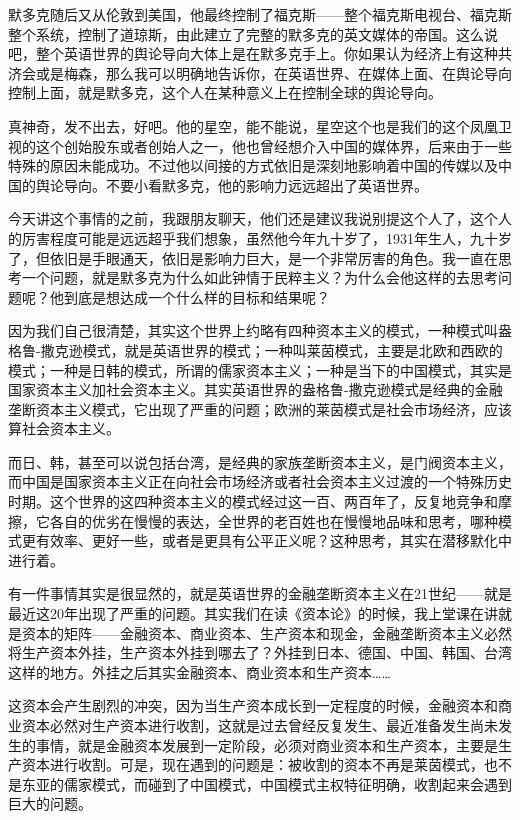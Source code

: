 \documentclass[UTF8, 12pt, a4paper]{ctexrep}
\begin{document}
默多克随后又从伦敦到美国，他最终控制了福克斯——整个福克斯电视台、福克斯整个系统，控制了道琼斯，由此建立了完整的默多克的英文媒体的帝国。这么说吧，整个英语世界的舆论导向大体上是在默多克手上。你如果认为经济上有这种共济会或是梅森，那么我可以明确地告诉你，在英语世界、在媒体上面、在舆论导向控制上面，就是默多克，这个人在某种意义上在控制全球的舆论导向。

真神奇，发不出去，好吧。他的星空，能不能说，星空这个也是我们的这个凤凰卫视的这个创始股东或者创始人之一，他也曾经想介入中国的媒体界，后来由于一些特殊的原因未能成功。不过他以间接的方式依旧是深刻地影响着中国的传媒以及中国的舆论导向。不要小看默多克，他的影响力远远超出了英语世界。

今天讲这个事情的之前，我跟朋友聊天，他们还是建议我说别提这个人了，这个人的厉害程度可能是远远超乎我们想象，虽然他今年九十岁了，1931年生人，九十岁了，但依旧是手眼通天，依旧是影响力巨大，是一个非常厉害的角色。我一直在思考一个问题，就是默多克为什么如此钟情于民粹主义？为什么会他这样的去思考问题呢？他到底是想达成一个什么样的目标和结果呢？

因为我们自己很清楚，其实这个世界上约略有四种资本主义的模式，一种模式叫盎格鲁-撒克逊模式，就是英语世界的模式；一种叫莱茵模式，主要是北欧和西欧的模式；一种是日韩的模式，所谓的儒家资本主义；一种是当下的中国模式，其实是国家资本主义加社会资本主义。其实英语世界的盎格鲁-撒克逊模式是经典的金融垄断资本主义模式，它出现了严重的问题；欧洲的莱茵模式是社会市场经济，应该算社会资本主义。

而日、韩，甚至可以说包括台湾，是经典的家族垄断资本主义，是门阀资本主义，而中国是国家资本主义正在向社会市场经济或者社会资本主义过渡的一个特殊历史时期。这个世界的这四种资本主义的模式经过这一百、两百年了，反复地竞争和摩擦，它各自的优劣在慢慢的表达，全世界的老百姓也在慢慢地品味和思考，哪种模式更有效率、更好一些，或者是更具有公平正义呢？这种思考，其实在潜移默化中进行着。

有一件事情其实是很显然的，就是英语世界的金融垄断资本主义在21世纪——就是最近这20年出现了严重的问题。其实我们在读《资本论》的时候，我上堂课在讲就是资本的矩阵——金融资本、商业资本、生产资本和现金，金融垄断资本主义必然将生产资本外挂，生产资本外挂到哪去了？外挂到日本、德国、中国、韩国、台湾这样的地方。外挂之后其实金融资本、商业资本和生产资本……

这资本会产生剧烈的冲突，因为当生产资本成长到一定程度的时候，金融资本和商业资本必然对生产资本进行收割，这就是过去曾经反复发生、最近准备发生尚未发生的事情，就是金融资本发展到一定阶段，必须对商业资本和生产资本，主要是生产资本进行收割。可是，现在遇到的问题是：被收割的资本不再是莱茵模式，也不是东亚的儒家模式，而碰到了中国模式，中国模式主权特征明确，收割起来会遇到巨大的问题。
\end{document}
